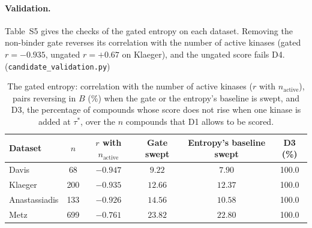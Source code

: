 \documentclass[11pt]{article}
\begin{document}
\paragraph{Validation.} Table~S5 gives the checks of the gated entropy on each dataset. Removing
the non-binder gate reverses its correlation with the number of active kinases (gated
$r = -0.935$, ungated $r = +0.67$ on Klaeger), and the ungated score fails D4.
(\texttt{candidate\_validation.py})

\begin{table}[h]
\centering
\caption{The gated entropy: correlation with the number of active kinases
($r$ with $n_\mathrm{active}$), pairs reversing in $B$ (\%) when the gate or
the entropy's baseline is swept, and D3, the percentage of compounds whose score
does not rise when one kinase is added at $\tau^*$, over the $n$ compounds that
D1 allows to be scored.}
\small
\setlength{\tabcolsep}{4pt}
\begin{tabular}{lccccc}
\toprule
Dataset & $n$ & $r$ with $n_\mathrm{active}$ & Gate swept & Entropy's
baseline swept & D3 (\%) \\
\midrule
Davis         & 68  & $-0.947$ & $9.22$  & $7.90$  & 100.0 \\
Klaeger       & 200 & $-0.935$ & $12.66$ & $12.37$ & 100.0 \\
Anastassiadis & 133 & $-0.926$ & $14.56$ & $10.58$ & 100.0 \\
Metz          & 699 & $-0.761$ & $23.82$ & $22.80$ & 100.0 \\
\bottomrule
\end{tabular}
\end{table}
\end{document}
